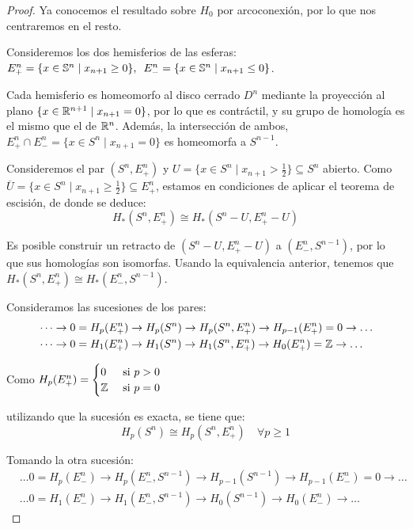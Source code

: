 \begin{proof}
  Ya conocemos el resultado sobre $H_0$ por arcoconexión, por lo que nos centraremos en el resto.

  Consideremos los dos hemisferios de las esferas: \\
  $E_+^n = \{x \in \S^n \mid x_{n+1} \geq 0\}, \hspace{0.5em} E_-^n = \{x \in \S^n \mid x_{n+1} \leq 0\}$.

  Cada hemisferio es homeomorfo al disco cerrado $D^n$ mediante la proyección al plano $\{x \in \R^{n+1} \mid x_{n+1} = 0\}$,
  por lo que es contráctil, y su grupo de homología es el mismo que el de $\R^n$. Además, la intersección de
  ambos, $E_+^n \cap E_-^n = \{x \in S^n \mid x_{n+1} = 0\}$ es homeomorfa a $S^{n-1}$.

  Consideremos el par $(S^n, E_+^n)$ y $U = \{x \in S^n \mid x_{n+1} > \frac{1}{2}\} \subseteq S^n$ abierto. Como
  $\overline{U} = \{x \in S^n \mid x_{n+1} \geq \frac{1}{2}\} \subseteq E_+^n$, estamos en condiciones de aplicar
  el teorema de escisión, de donde se deduce:
  \[ H_*(S^n, E_+^n) \cong H_*(S^n - U, E_+^n - U) \]

  Es posible construir un retracto de $(S^n - U, E_+^n - U)$ a $(E_-^n, S^{n-1})$, por lo que sus
  homologías son isomorfas. Usando la equivalencia anterior, tenemos que $H_*(S^n, E_+^n) \cong H_*(E_-^n, S^{n-1})$.

  Consideramos las sucesiones de los pares:
  \begin{align*}
    &\dots \to 0 = H_p(E_+^n) \to H_p(S^n) \to H_p(S^n, E_+^n) \to H_{p-1}(E_+^n) = 0 \to \dots \\
    &\dots \to 0 = H_1(E_+^n) \to H_1(S^n) \to H_1(S^n, E_+^n) \to H_0(E_+^n) = \Z \to \dots
  \end{align*}

  Como $H_p(E_+^n) = \begin{cases} 0 &\text{ si } p > 0 \\ \Z &\text{ si } p = 0 \end{cases}$

  utilizando que la sucesión es exacta, se tiene que:
  \[H_p(S^n) \cong H_p(S^n, E_+^n) \quad \forall p \geq 1\]

  Tomando la otra sucesión:
  \begin{align*}
    &\dots 0 = H_p(E_-^n) \to H_p(E_-^n, S^{n-1}) \to H_{p-1}(S^{n-1}) \to H_{p-1}(E_-^n) = 0 \to \dots \\
    &\dots 0 = H_1(E_-^n) \to H_1(E_-^n, S^{n-1}) \to H_0(S^{n-1}) \to H_0(E_-^n) \to \dots
  \end{align*}


\end{proof}
